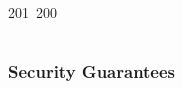 201~200~\documentclass{article}
\begin{document}
\begin{lstlisting}[language=Python, caption=Shared Secret Computation and Encryption Key Derivation]
	                                                                                                                                                                                                                                                                                                	                                                                                                                                        	    	                                                                                                	                                                                                                                                                                                                                                                                                                                                	                                                                        	                                                                        	                                                                                                                                        	                                                                                                                                                                                                                        	                                                    \end{lstlisting}

	                                                                                                                                                                                                                                                                                                	                                                                                                                                        	    	                                                                                                	                                                                                                                                                                                                                                                                                                                                	                                                                        	                                                                        	                                                                                                                                        	                                                                                                                                                                                                                        	                                                    \subsubsection{Security Guarantees}
\end{document}
